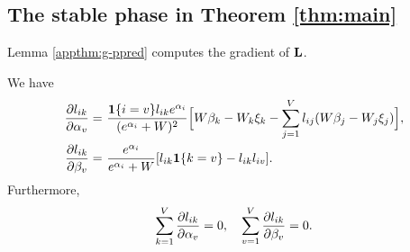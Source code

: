 \subsection{The stable phase in  Theorem \ref{thm:main}}\label{app:proof-main}

Lemma \ref{appthm:g-ppred} computes the gradient of $\mathbf{L}$.
\begin{lemma}\label{appthm:g-ppred} 
We have
\begin{align*}
\frac{\partial l_{ik}}{\partial \alpha_v} = &~ \frac{\bm{1}\{i=v\} l_{ik}e^{\alpha_i}}{(e^{\alpha_i}+W)^2} \Big[W\beta_k-W_k \xi_k - \sum_{j=1}^V l_{ij} (W\beta_j - W_j\xi_j)\Big],\\
\frac{\partial l_{ik}}{\partial \beta_v} = &~ \frac{e^{\alpha_i}}{e^{\alpha_i}+W}[l_{ik}\bm{1}\{k=v\} - l_{ik}l_{iv}].\\
\end{align*}
Furthermore,
\[
\sum_{k=1}^V \frac{\partial l_{ik}}{\partial \alpha_v} = 0, \quad \sum_{v=1}^V \frac{\partial l_{ik}}{\partial \beta_v} = 0.
\]
\end{lemma}
